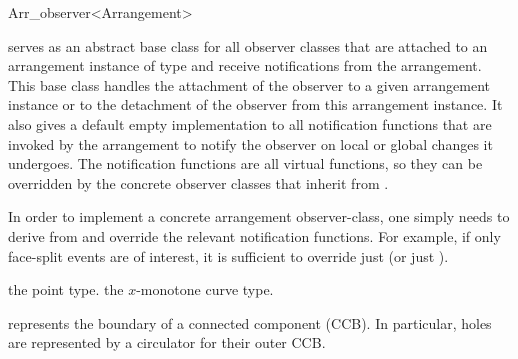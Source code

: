 
\ccRefPageBegin

\begin{ccRefClass}{Arr_observer<Arrangement>}
\label{arr_ref:arr_obs}

\ccDefinition

\ccClassTemplateName{} serves as an abstract base class for all observer
classes that are attached to an arrangement instance of type 
and receive notifications from the arrangement.
This base class handles the attachment of the
observer to a given arrangement instance or to the detachment of the
observer from this arrangement instance. It also gives a default empty
implementation to all notification functions that are invoked by the
arrangement to notify the observer on local or global changes it undergoes.
The notification functions are all virtual functions, so they can be
overridden by the concrete observer classes that inherit from
\ccClassTemplateName.

In order to implement a concrete arrangement observer-class, one simply
needs to derive from \ccClassTemplateName{} and override the relevant
notification functions. For example, if only face-split events are of
interest, it is sufficient to override just  
(or just ).


\ccTypes


    {the point type.}
\ccGlue
{}
    {the $x$-monotone curve type.}

\ccGlue
{}
\ccGlue
{}
\ccGlue
{}
    {represents the boundary of a connected component (CCB).
     In particular, holes are represented by a circulator for their outer CCB.}


\end{ccRefClass}
